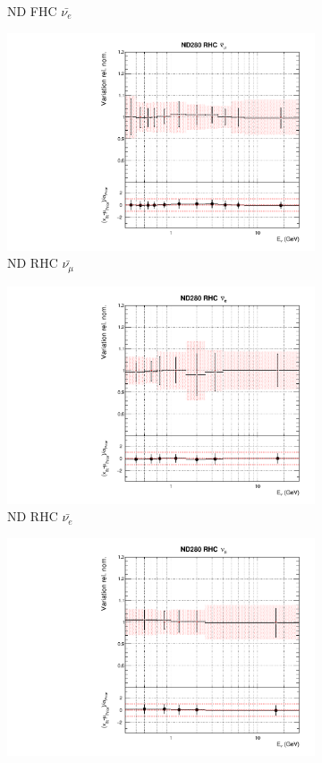\begin{figure}
\begin{subfigure}{0.24\textwidth}
  \caption{ND FHC $\bar{\nu_{e}}$}
\end{subfigure}
\begin{subfigure}{0.24\textwidth}
  \centering
  \includegraphics[width=0.95\linewidth]{figs/asmvflux4}
  \caption{ND RHC $\bar{\nu_{\mu}}$}
\end{subfigure}
\begin{subfigure}{0.24\textwidth}
  \centering
  \includegraphics[width=0.95\linewidth]{figs/asmvflux5}
  \caption{ND RHC $\bar{\nu_{e}}$}
\end{subfigure}
\begin{subfigure}{0.24\textwidth}
  \centering
  \includegraphics[width=0.95\linewidth]{figs/asmvflux6}

\end{subfigure}
\end{figure}

